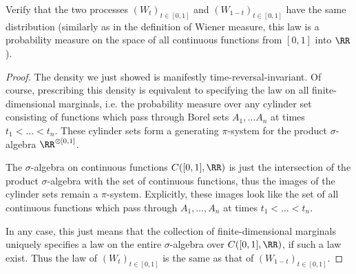 \documentclass{scrartcl}
\DeclareMathOperator{\cov}{cov}
\begin{document}
    
\begin{prob}
    Verify that the two processes $(W_t)_{t \in [0, 1]}$ and $(W_{1-t})_{t \in [0, 1]}$ have the same distribution (similarly as in the definition of Wiener measure, this law is a probability measure on the space of all continuous functions from $[0, 1]$ into $\RR$).
\end{prob}
\begin{proof}
    The density we just showed is manifestly time-reversal-invariant. Of course, prescribing this density is equivalent to specifying the law on all finite-dimensional marginals, i.e. the probability measure over any cylinder set consisting of functions which pass through Borel sets $A_1,\dots A_n$ at times $t_1 < \dots < t_n$. These cylinder sets form a generating $\pi$-system for the product $\sigma$-algebra $\RR^{\otimes [0,1]}$. 
    
    The $\sigma$-algebra on continuous functions $C([0,1], \RR)$ is just the intersection of the product $\sigma$-algebra with the set of continuous functions, thus the images of the cylinder sets remain a $\pi$-system. Explicitly, these images look like the set of all continuous functions which pass through $A_1,\dots, A_n$ at times $t_1 < \dots < t_n$.
    
    In any case, this just means that the collection of finite-dimensional marginals uniquely specifies a law on the entire $\sigma$-algebra over $C([0,1],\RR)$, if such a law exist. Thus the law of $(W_t)_{t\in [0,1]}$ is the same as that of $(W_{1-t})_{t\in [0,1]}$.
\end{proof}
\end{document}
